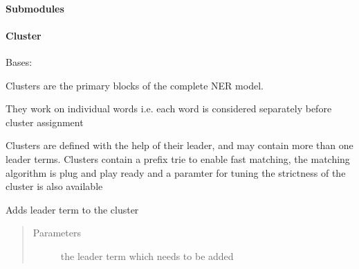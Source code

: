 \documentclass[letterpaper,10pt,english]{sphinxmanual}
\begin{document}
\paragraph{Submodules}
\label{\detokenize{src.cluster:submodules}}

\paragraph{Cluster}
\label{\detokenize{src.cluster:module-src.cluster.Cluster}}\label{\detokenize{src.cluster:cluster}}

\begin{fulllineitems}
\label{\detokenize{src.cluster:src.cluster.Cluster.Cluster}}
Bases: 

Clusters are the primary blocks of the complete NER model.

They work on individual words i.e. each word is considered separately before cluster assignment

Clusters are defined with the help of their leader, and may contain more than one leader terms. Clusters contain a prefix trie to enable fast matching, the matching algorithm is plug and play ready and a paramter for tuning the strictness of the cluster is also available

\begin{fulllineitems}
\label{\detokenize{src.cluster:src.cluster.Cluster.Cluster.add_leader}}
Adds leader term to the cluster
\begin{quote}\begin{description}
\item[{Parameters}] \leavevmode
{} \textendash{} the leader term which needs to be added

\end{description}\end{quote}

\end{fulllineitems}



\end{fulllineitems}
\end{document}
